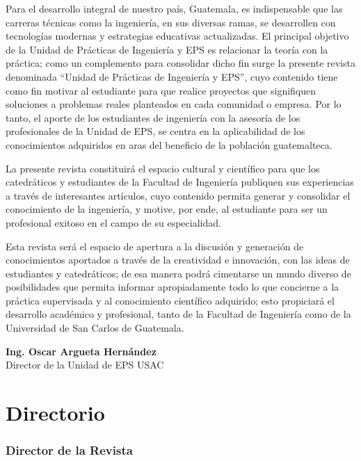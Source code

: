 \documentclass[11pt,spanish,Letterpaper,openany]{book}
\begin{document}
Para el desarrollo integral de nuestro país, Guatemala, es indispensable que las carreras técnicas como la ingeniería, en sus diversas ramas, se desarrollen con tecnologías modernas y estrategias educativas actualizadas. El principal objetivo de la Unidad de Prácticas de Ingeniería y EPS es relacionar la teoría con la práctica; como un complemento para consolidar dicho fin surge la presente revista denominada ``Unidad de Prácticas de Ingeniería y EPS'', cuyo contenido tiene como fin motivar al estudiante para que realice proyectos que signifiquen soluciones a problemas reales planteados en cada comunidad o empresa. Por lo tanto, el aporte de los estudiantes de ingeniería con la asesoría de los profesionales de la Unidad de EPS, se centra en la aplicabilidad de los conocimientos adquiridos en aras del beneficio de la población guatemalteca.

La presente revista constituirá el espacio cultural y científico para que los catedráticos y estudiantes de la Facultad de Ingeniería publiquen sus experiencias a través de interesantes artículos, cuyo contenido permita generar y consolidar el conocimiento de la ingeniería, y motive, por ende, al estudiante para ser un profesional exitoso en el campo de su especialidad.

Esta revista será el espacio de apertura a la discusión y generación de conocimientos aportados a través de la creatividad e innovación, con las ideas de estudiantes y catedráticos; de esa manera podrá cimentarse un mundo diverso de posibilidades que permita informar apropiadamente todo lo que concierne a la práctica supervisada y al conocimiento científico adquirido; esto propiciará el desarrollo académico y profesional, tanto de la Facultad de Ingeniería como de la Universidad de San Carlos de Guatemala.
\bigskip
\bigskip
\bigskip

\begin {center}

\textbf{Ing. Oscar Argueta Hernández}\\
Director de la Unidad de EPS USAC

\end {center}

\newpage

\hypertarget{directorio}{%
\chapter*{Directorio}\label{directorio}}

\hypertarget{director-de-la-revista}{%
\subsection*{Director de la Revista}\label{director-de-la-revista}}
\end{document}
